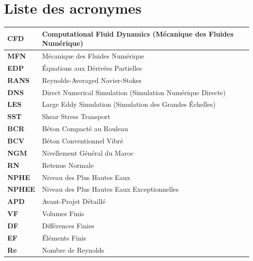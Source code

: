 \chapter*{Liste des acronymes}
\thispagestyle{plain}

\vspace{1cm}

\renewcommand{\arraystretch}{1.5}
\begin{longtable}{|>{\centering\arraybackslash\bfseries}p{4cm}|>{\centering\arraybackslash}p{10cm}|}
\hline
\textbf{CFD} & Computational Fluid Dynamics (Mécanique des Fluides Numérique) \\ \hline
\textbf{MFN} & Mécanique des Fluides Numérique \\ \hline
\textbf{EDP} & Équations aux Dérivées Partielles \\ \hline
\textbf{RANS} & Reynolds-Averaged Navier-Stokes \\ \hline
\textbf{DNS} & Direct Numerical Simulation (Simulation Numérique Directe) \\ \hline
\textbf{LES} & Large Eddy Simulation (Simulation des Grandes Échelles) \\ \hline
\textbf{SST} & Shear Stress Transport \\ \hline
\textbf{BCR} & Béton Compacté au Rouleau \\ \hline
\textbf{BCV} & Béton Conventionnel Vibré \\ \hline
\textbf{NGM} & Nivellement Général du Maroc \\ \hline
\textbf{RN} & Retenue Normale \\ \hline
\textbf{NPHE} & Niveau des Plus Hautes Eaux \\ \hline
\textbf{NPHEE} & Niveau des Plus Hautes Eaux Exceptionnelles \\ \hline
\textbf{APD} & Avant-Projet Détaillé \\ \hline
\textbf{VF} & Volumes Finis \\ \hline
\textbf{DF} & Différences Finies \\ \hline
\textbf{EF} & Éléments Finis \\ \hline
\textbf{Re} & Nombre de Reynolds \\ \hline
\end{longtable}

\newpage

